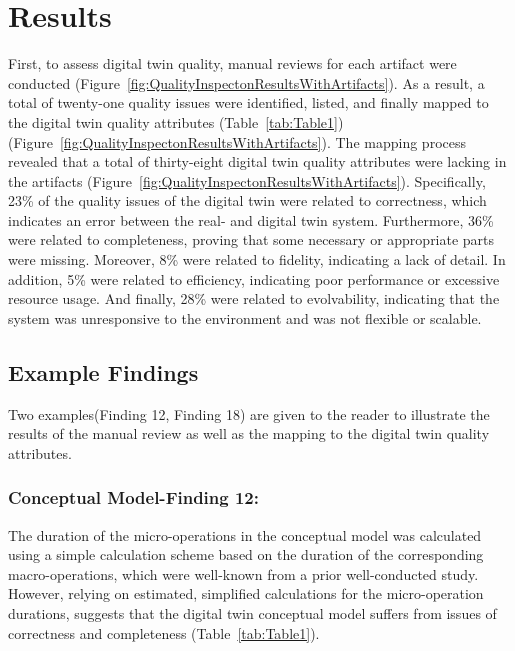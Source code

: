 \documentclass{llncs}
\begin{document}
    \section{Results}
    First, to assess digital twin quality, manual reviews for each artifact were conducted (Figure~\ref{fig:QualityInspectonResultsWithArtifacts}). 
    As a result, a total of twenty-one quality issues were identified, listed, and finally mapped to the digital twin quality attributes (Table~\ref{tab:Table1}) (Figure~\ref{fig:QualityInspectonResultsWithArtifacts}).
    The mapping process revealed that a total of thirty-eight digital twin quality attributes were lacking in the artifacts (Figure~\ref{fig:QualityInspectonResultsWithArtifacts}).  
    Specifically, 23\% of the quality issues of the digital twin were related to correctness, which indicates an error between the real- and digital twin system. Furthermore, 36\%  were related 
    to completeness, proving that some necessary or appropriate parts were missing.
    Moreover, 8\%  were related to fidelity, indicating a lack of detail. 
    In addition, 5\%  were related to efficiency, indicating poor performance or excessive resource usage.
    And finally, 28\% were related to evolvability, indicating that the system was unresponsive 
    to the environment and was not flexible or scalable.
    \subsection{Example Findings}  
    Two examples(Finding 12, Finding 18) are given to the reader to illustrate 
    the results of the manual review as well as the mapping to the digital twin quality attributes. 
    \subsubsection{Conceptual Model-Finding 12:}
    The duration of the micro-operations in the conceptual model was calculated using a simple calculation 
    scheme based on the duration of the corresponding macro-operations,
     which were well-known from a prior well-conducted study. 
    However, relying on estimated, 
    simplified calculations for the micro-operation durations,
    suggests that the digital twin conceptual model suffers from issues of correctness and completeness (Table~\ref{tab:Table1}). 
\end{document}
